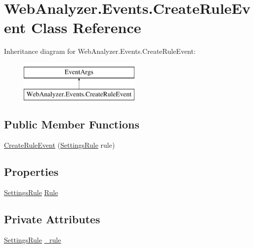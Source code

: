 \hypertarget{class_web_analyzer_1_1_events_1_1_create_rule_event}{}\section{Web\+Analyzer.\+Events.\+Create\+Rule\+Event Class Reference}
\label{class_web_analyzer_1_1_events_1_1_create_rule_event}
Inheritance diagram for Web\+Analyzer.\+Events.\+Create\+Rule\+Event\+:\begin{figure}[H]
\begin{center}
\leavevmode
\includegraphics[height=2.000000cm]{class_web_analyzer_1_1_events_1_1_create_rule_event}
\end{center}
\end{figure}
\subsection*{Public Member Functions}
\begin{DoxyCompactItemize}
\item 
\hyperlink{class_web_analyzer_1_1_events_1_1_create_rule_event_ac5962b1de36f092453cc68f4e7247a97}{Create\+Rule\+Event} (\hyperlink{class_web_analyzer_1_1_models_1_1_settings_model_1_1_settings_rule}{Settings\+Rule} rule)
\end{DoxyCompactItemize}
\subsection*{Properties}
\begin{DoxyCompactItemize}
\item 
\hyperlink{class_web_analyzer_1_1_models_1_1_settings_model_1_1_settings_rule}{Settings\+Rule} \hyperlink{class_web_analyzer_1_1_events_1_1_create_rule_event_a71f6a5e08aac9efa2b7da9052f8890e3}{Rule}
\end{DoxyCompactItemize}
\subsection*{Private Attributes}
\begin{DoxyCompactItemize}
\item 
\hyperlink{class_web_analyzer_1_1_models_1_1_settings_model_1_1_settings_rule}{Settings\+Rule} \hyperlink{class_web_analyzer_1_1_events_1_1_create_rule_event_aa7ea8115af74d881c10cc99d44652340}{\+\_\+rule}
\end{DoxyCompactItemize}


